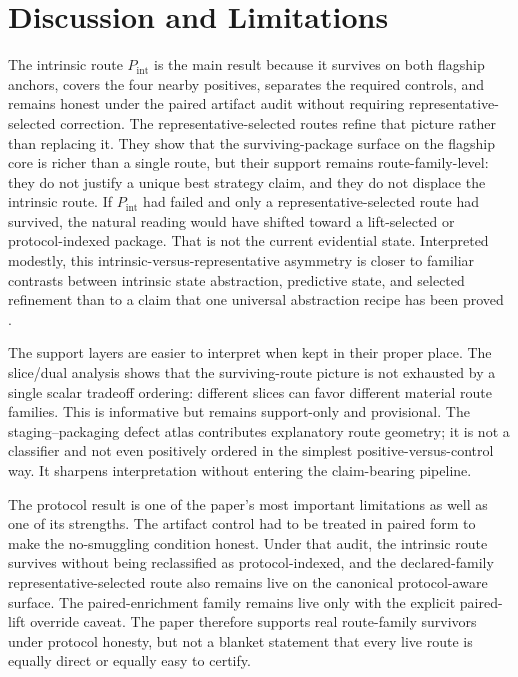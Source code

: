 \documentclass[11pt]{article}
\theoremstyle{definition}
\begin{document}
 \section{Discussion and Limitations}\label{sec:discussion}

The intrinsic route $P_{\mathrm{int}}$ is the main result because it survives on both flagship anchors, covers the four nearby positives, separates the required controls, and remains honest under the paired artifact audit without requiring representative-selected correction. The representative-selected routes refine that picture rather than replacing it. They show that the surviving-package surface on the flagship core is richer than a single route, but their support remains route-family-level: they do not justify a unique best strategy claim, and they do not displace the intrinsic route. If $P_{\mathrm{int}}$ had failed and only a representative-selected route had survived, the natural reading would have shifted toward a lift-selected or protocol-indexed package. That is not the current evidential state. Interpreted modestly, this intrinsic-versus-representative asymmetry is closer to familiar contrasts between intrinsic state abstraction, predictive state, and selected refinement than to a claim that one universal abstraction recipe has been proved \citep{LiWalshLittman2006,LittmanSuttonSingh2001,Jaeger2000,CousotCousot1977}.

The support layers are easier to interpret when kept in their proper place. The slice/dual analysis shows that the surviving-route picture is not exhausted by a single scalar tradeoff ordering: different slices can favor different material route families. This is informative but remains support-only and provisional. The staging--packaging defect atlas contributes explanatory route geometry; it is not a classifier and not even positively ordered in the simplest positive-versus-control way. It sharpens interpretation without entering the claim-bearing pipeline.

The protocol result is one of the paper's most important limitations as well as one of its strengths. The artifact control had to be treated in paired form to make the no-smuggling condition honest. Under that audit, the intrinsic route survives without being reclassified as protocol-indexed, and the declared-family representative-selected route also remains live on the canonical protocol-aware surface. The paired-enrichment family remains live only with the explicit paired-lift override caveat. The paper therefore supports real route-family survivors under protocol honesty, but not a blanket statement that every live route is equally direct or equally easy to certify.
\end{document}

